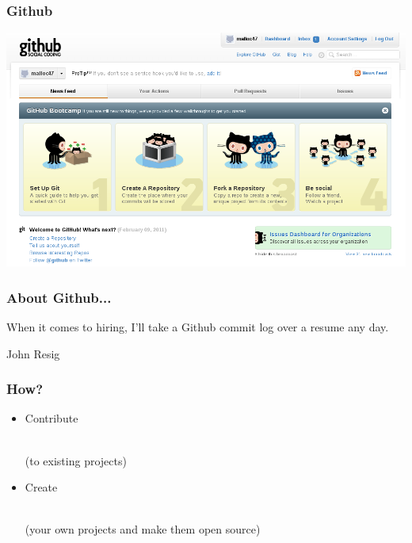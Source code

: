 \documentclass{beamer}
\begin{document}
\begin{frame}
  \frametitle{Github}
  \begin{center} \includegraphics[width=1\textwidth]{../img/github-screenshot} \end{center}
\end{frame}

\begin{frame}
  \frametitle{About Github...}
    \begin{Large}
      When it comes to hiring, I'll take a Github commit log over a
      resume any day.
      \begin{flushright}
        \textemdash{}John Resig
      \end{flushright}

    \end{Large}
\end{frame}

\begin{frame}
  \frametitle{How?}
  \begin{itemize}
    \setlength{\itemsep}{2em}
  \item \begin{LARGE} Contribute \end{LARGE} \\ (to existing projects)
  \item \begin{LARGE} Create \end{LARGE} \\ (your own projects and make them open source)
  \end{itemize}
\end{frame}
\end{document}
